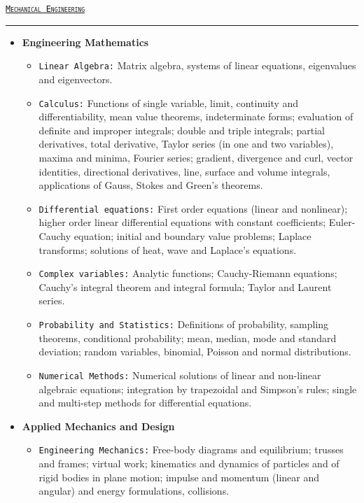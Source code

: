 \documentclass{article}
\begin{document}
\thispagestyle{empty}
\begin{center} \large{\textsc{\texttt{\underline{Mechanical Engineering}}}} \end{center}
\hrule
{\footnotesize
\begin{multicols}{2}
\begin{itemize}
\item \textbf{Engineering Mathematics}
\begin{itemize}
\item \texttt{Linear Algebra:} Matrix algebra, systems of linear equations, eigenvalues and eigenvectors.
\item \texttt{Calculus:} Functions of single variable, limit, continuity and differentiability, mean value theorems, indeterminate forms; evaluation of definite and improper integrals; double and triple integrals; partial derivatives, total derivative, Taylor series (in one and two variables), maxima and minima, Fourier series; gradient, divergence and curl, vector identities, directional derivatives, line, surface and volume integrals, applications of Gauss, Stokes and Green’s theorems.
\item \texttt{Differential equations:} First order equations (linear and nonlinear); higher order linear differential equations with constant coefficients; Euler-Cauchy equation; initial and boundary value problems; Laplace transforms; solutions of heat, wave and Laplace's equations.
\item \texttt{Complex variables:} Analytic functions; Cauchy-Riemann equations; Cauchy’s integral theorem and integral formula; Taylor and Laurent series.
\item \texttt{Probability and Statistics:} Definitions of probability, sampling theorems, conditional probability; mean, median, mode and standard deviation; random variables, binomial, Poisson and normal distributions.
\item \texttt{Numerical Methods:} Numerical solutions of linear and non-linear algebraic equations; integration by trapezoidal and Simpson’s rules; single and multi-step methods for differential equations.
\end{itemize}
\item \textbf{Applied Mechanics and Design}
\begin{itemize}
\item \texttt{Engineering Mechanics:} Free-body diagrams and equilibrium; trusses and frames; virtual work; kinematics and dynamics of particles and of rigid bodies in plane motion; impulse and momentum (linear and angular) and energy formulations, collisions.

\end{itemize}
\end{itemize}
\end{multicols}}
\end{document}
